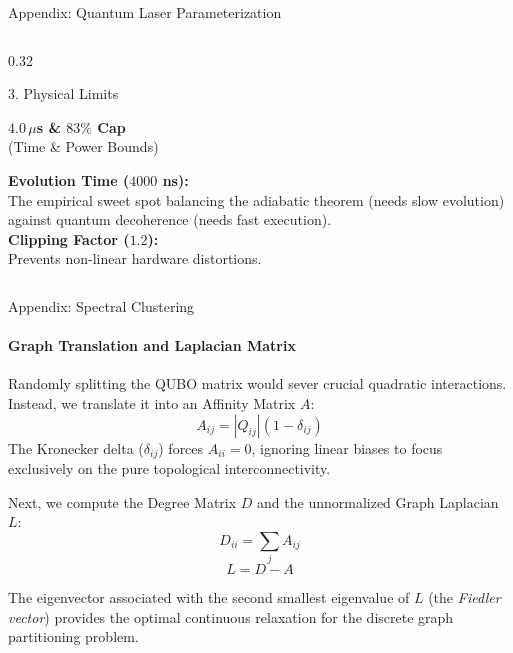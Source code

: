 \documentclass[10pt, aspectratio=169]{beamer}
\begin{document}
\begin{frame}{Appendix: Quantum Laser Parameterization}
\begin{columns}[T]
        \begin{column}{0.32\textwidth}
            \begin{block}{3. Physical Limits}
                \begin{minipage}[t][5.5cm][t]{\linewidth}
                    \vspace{0.2cm}
                    \centering
                    {\large \textbf{$4.0 \, \mu$s \& $83\%$ Cap}}\\[0.1cm]
                    \footnotesize (Time \& Power Bounds)
                    \vspace{0.3cm}
                    
                    \raggedright
                    \small
                    \textbf{Evolution Time ($4000$ ns):}\\ The empirical sweet spot balancing the adiabatic theorem (needs slow evolution) against quantum decoherence (needs fast execution).\\[0.2cm]
                    \textbf{Clipping Factor ($1.2$):}\\ Prevents non-linear hardware distortions.
                \end{minipage}
            \end{block}
        \end{column}
        
    \end{columns}
    
\end{frame}


\begin{frame}{Appendix: Spectral Clustering}
\framesubtitle{Graph Translation and Laplacian Matrix}
    Randomly splitting the QUBO matrix would sever crucial quadratic interactions. Instead, we translate it into an Affinity Matrix $A$:
    $$ A_{ij} = |Q_{ij}|(1 - \delta_{ij}) $$
    The Kronecker delta ($\delta_{ij}$) forces $A_{ii} = 0$, ignoring linear biases to focus exclusively on the pure topological interconnectivity.
    
    \vspace{0.4cm}
    Next, we compute the Degree Matrix $D$ and the unnormalized Graph Laplacian $L$:
    $$ D_{ii} = \sum_{j} A_{ij} $$
    $$ L = D - A $$
    \vspace{0.2cm}
    
    The eigenvector associated with the second smallest eigenvalue of $L$ (the \textit{Fiedler vector}) provides the optimal continuous relaxation for the discrete graph partitioning problem.
\end{frame}
\end{document}
